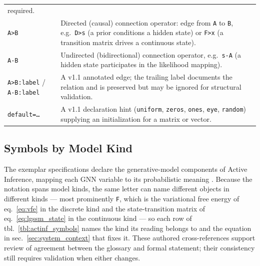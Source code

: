 \documentclass[
  english,
  9pt,
]{extarticle}
\begin{document}
\begin{longtable}[]{@{}
  >{\raggedright\arraybackslash}p{}
  >{\raggedright\arraybackslash}p{}@{}}
required. \\
\texttt{A\textgreater{}B} & Directed (causal) connection operator: edge
from \texttt{A} to \texttt{B}, e.g.~\texttt{D\textgreater{}s} (a prior
conditions a hidden state) or \texttt{F\textgreater{}x} (a transition
matrix drives a continuous state). \\
\texttt{A-B} & Undirected (bidirectional) connection operator,
e.g.~\texttt{s-A} (a hidden state participates in the likelihood
mapping). \\
\texttt{A\textgreater{}B:label} / \texttt{A-B:label} & A v1.1 annotated
edge; the trailing label documents the relation and is preserved but may
be ignored for structural validation. \\
\texttt{default=…} & A v1.1 declaration hint (\texttt{uniform},
\texttt{zeros}, \texttt{ones}, \texttt{eye}, \texttt{random}) supplying
an initialization for a matrix or vector. \\
\end{longtable}

\subsection{Symbols by Model Kind}\label{symbols-by-model-kind}

The exemplar specifications declare the generative-model components of
Active Inference, mapping each GNN variable to its probabilistic meaning
\citep{dacosta2020, smith2022, parr2022}. Because the notation spans
model kinds, the same letter can name different objects in different
kinds --- most prominently \texttt{F}, which is the variational free
energy of eq.~\ref{eq:vfe} in the discrete kind and the state-transition
matrix of eq.~\ref{eq:lgssm_state} in the continuous kind --- so each
row of tbl.~\ref{tbl:actinf_symbols} names the kind its reading belongs
to and the equation in sec.~\ref{sec:system_context} that fixes it.
These authored cross-references support review of agreement between the
glossary and formal statement; their consistency still requires
validation when either changes.
\end{document}
